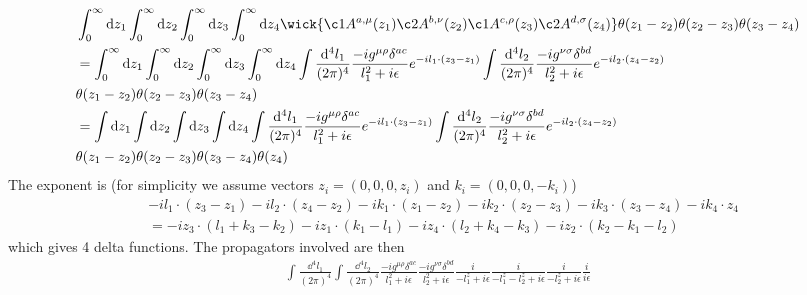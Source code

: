 \documentclass{article}
\newcommand{\mm}[1]{\frac{\dd^4#1}{(2\pi)^4}}
\begin{document}
\begin{align*}
	&\int_0^\infty\dd z_1\int_0^\infty\dd z_2\int_0^\infty\dd z_3\int_0^\infty\dd z_4\wick{\c1A^{a,\mu}(z_1)\c2A^{b,\nu}(z_2)\c1A^{c,\rho}(z_3)\c2A^{d,\sigma}(z_4)}\theta(z_1-z_2)\theta(z_2-z_3)\theta(z_3-z_4)\\
	&=\int_0^\infty\dd z_1\int_0^\infty\dd z_2\int_0^\infty\dd z_3\int_0^\infty\dd z_4\int\mm{l_1}\frac{-ig^{\mu\rho}\delta^{ac}}{l_1^2+i\epsilon}e^{-il_1\cdot(z_3-z_1)}\int\mm{l_2}\frac{-ig^{\nu\sigma}\delta^{bd}}{l_2^2+i\epsilon}e^{-il_2\cdot(z_4-z_2)}\\&\theta(z_1-z_2)\theta(z_2-z_3)\theta(z_3-z_4)\\
	&=\int\dd z_1\int\dd z_2\int\dd z_3\int\dd z_4\int\mm{l_1}\frac{-ig^{\mu\rho}\delta^{ac}}{l_1^2+i\epsilon}e^{-il_1\cdot(z_3-z_1)}\int\mm{l_2}\frac{-ig^{\nu\sigma}\delta^{bd}}{l_2^2+i\epsilon}e^{-il_2\cdot(z_4-z_2)}\\&\theta(z_1-z_2)\theta(z_2-z_3)\theta(z_3-z_4)\theta(z_4)
\end{align*}
The exponent is (for simplicity we assume vectors $z_i=(0,0,0,z_i)$ and $k_i=(0,0,0,-k_i)$) 
\begin{align*}
	&-il_1\cdot(z_3-z_1)-il_2\cdot(z_4-z_2)-ik_1\cdot(z_1-z_2)-ik_2\cdot(z_2-z_3)-ik_3\cdot(z_3-z_4)-ik_4\cdot z_4\\
	&=-iz_3\cdot(l_1+k_3-k_2)-iz_1\cdot(k_1-l_1)-iz_4\cdot(l_2+k_4-k_3)-iz_2\cdot(k_2-k_1-l_2)
\end{align*}
which gives 4 delta functions. The propagators involved are then
\begin{align*}
	\int\mm{l_1}\int\mm{l_2}\frac{-ig^{\mu\rho}\delta^{ac}}{l_1^2+i\epsilon}\frac{-ig^{\nu\sigma}\delta^{bd}}{l_2^2+i\epsilon}\frac{i}{-l_1^z+i\epsilon}\frac{i}{-l_1^z-l_2^z+i\epsilon}\frac{i}{-l_2^z+i\epsilon}\frac{i}{i\epsilon}
\end{align*}
\end{document}
